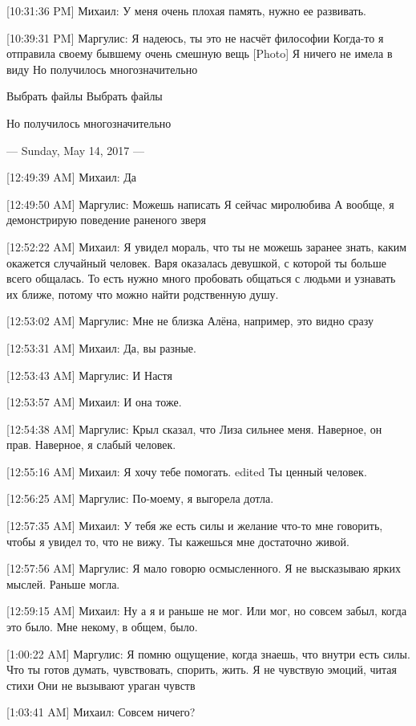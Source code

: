 \documentclass{article}
\begin{document}
[10:31:36 PM] Михаил:
У меня очень плохая память, нужно ее развивать.

[10:39:31 PM] Маргулис:
Я надеюсь, ты это не насчёт философии
 Когда-то я отправила своему бывшему очень смешную вещь
 [Photo]
 Я ничего не имела в виду
 Но получилось многозначительно
 
 Выбрать файлы Выбрать файлы
 
 
 
 Но получилось многозначительно

--- Sunday, May 14, 2017 ---

[12:49:39 AM] Михаил:
Да

[12:49:50 AM] Маргулис:
Можешь написать
 Я сейчас миролюбива
 А вообще, я демонстрирую поведение раненого зверя

[12:52:22 AM] Михаил:
Я увидел мораль, что ты не можешь заранее знать, каким окажется случайный человек. Варя оказалась девушкой, с которой ты больше всего общалась. То есть нужно много пробовать общаться с людьми и узнавать их ближе, потому что можно найти родственную душу.

[12:53:02 AM] Маргулис:
Мне не близка Алёна, например, это видно сразу

[12:53:31 AM] Михаил:
Да, вы разные.

[12:53:43 AM] Маргулис:
И Настя

[12:53:57 AM] Михаил:
И она тоже.

[12:54:38 AM] Маргулис:
Крыл сказал, что Лиза сильнее меня. Наверное, он прав.
 Наверное, я слабый человек.

[12:55:16 AM] Михаил:
Я хочу тебе помогать.
edited 
Ты ценный человек.

[12:56:25 AM] Маргулис:
По-моему, я выгорела дотла.

[12:57:35 AM] Михаил:
У тебя же есть силы и желание что-то мне говорить, чтобы я увидел то, что не вижу. Ты кажешься мне достаточно живой.

[12:57:56 AM] Маргулис:
Я мало говорю осмысленного.
 Я не высказываю ярких мыслей.
 Раньше могла.

[12:59:15 AM] Михаил:
Ну а я и раньше не мог. Или мог, но совсем забыл, когда это было. Мне некому, в общем, было.

[1:00:22 AM] Маргулис:
Я помню ощущение, когда знаешь, что внутри есть силы. Что ты готов думать, чувствовать, спорить, жить.
 Я не чувствую эмоций, читая стихи
 Они не вызывают ураган чувств

[1:03:41 AM] Михаил:
Совсем ничего?
\end{document}
